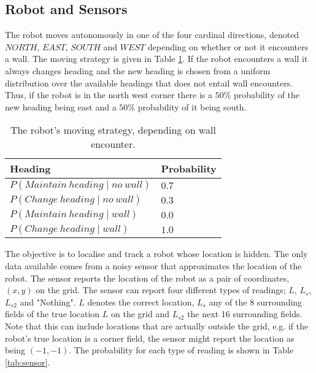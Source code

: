 \documentclass{article}
\begin{document}
\subsection{Robot and Sensors}
The robot moves autonomously in one of the four cardinal directions, denoted $NORTH$, $EAST$, $SOUTH$ and $WEST$ depending on whether or not it encounters a wall. The moving strategy is given in Table \ref{tab:robot}. If the robot encounters a wall it always changes heading and the new heading is chosen from a uniform distribution over the available headings that does not entail wall encounters. Thus, if the robot is in the north west corner there is a $50\%$ probability of the new heading being east and a $50\%$ probability of it being south.
\begin{table}[ht]
\centering
  \begin{tabular}{ | l | l | }
    \hline
    \textbf{Heading}                            & \textbf{Probability}  \\ \hline
    $P(Maintain\ heading \mid no\ wall)$      & $0.7$                 \\ \hline
    $P(Change\ heading \mid no\ wall)$        & $0.3$                 \\ \hline
    $P(Maintain\ heading \mid wall)$          & $0.0$                 \\ \hline
    $P(Change\ heading \mid wall)$            & $1.0$                 \\ \hline
  \end{tabular}
  \caption{The robot's moving strategy, depending on wall encounter.}
  \label{tab:robot}
\end{table}

The objective is to localise and track a robot whose location is hidden. The only data available comes from a noisy sensor that approximates the location of the robot. The sensor reports the location of the robot as a pair of coordinates, $(x, y)$ on the grid. The sensor can report four different types of readings; $L$, $L_s$, $L_{s2}$ and "Nothing". $L$ denotes the correct location, $L_s$ any of the $8$ surrounding fields of the true location $L$ on the grid and $L_{s2}$ the next 16 surrounding fields. Note that this can include locations that are actually outside the grid, e.g. if the robot's true location is a corner field, the sensor might report the location as being $(-1, -1)$. The probability for each type of reading is shown in Table \ref{tab:sensor}.
\end{document}
